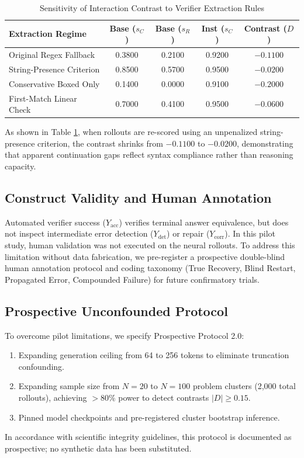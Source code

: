 \documentclass[conference]{IEEEtran}
\begin{document}
\begin{table}[htbp]
\caption{Sensitivity of Interaction Contrast to Verifier Extraction Rules}
\label{tab:verifier_sensitivity}
\centering
\begin{tabularx}{\columnwidth}{Xcccc}
\toprule
\textbf{Extraction Regime} & \textbf{Base ($s_C$)} & \textbf{Base ($s_R$)} & \textbf{Inst ($s_C$)} & \textbf{Contrast ($D$)} \\
\midrule
Original Regex Fallback & 0.3800 & 0.2100 & 0.9200 & \textbf{$-0.1100$} \\
String-Presence Criterion & 0.8500 & 0.5700 & 0.9500 & \textbf{$-0.0200$} \\
Conservative Boxed Only & 0.1400 & 0.0000 & 0.9100 & \textbf{$-0.2000$} \\
First-Match Linear Check & 0.7000 & 0.4100 & 0.9500 & \textbf{$-0.0600$} \\
\bottomrule
\end{tabularx}
\end{table}

As shown in Table \ref{tab:verifier_sensitivity}, when rollouts are re-scored using an unpenalized string-presence criterion, the contrast shrinks from $-0.1100$ to $-0.0200$, demonstrating that apparent continuation gaps reflect syntax compliance rather than reasoning capacity.

\subsection{Construct Validity and Human Annotation}
Automated verifier success ($Y_{\text{acc}}$) verifies terminal answer equivalence, but does not inspect intermediate error detection ($Y_{\text{det}}$) or repair ($Y_{\text{corr}}$). In this pilot study, human validation was not executed on the neural rollouts. To address this limitation without data fabrication, we pre-register a prospective double-blind human annotation protocol and coding taxonomy (True Recovery, Blind Restart, Propagated Error, Compounded Failure) for future confirmatory trials.

\subsection{Prospective Unconfounded Protocol}
To overcome pilot limitations, we specify Prospective Protocol 2.0:
\begin{enumerate}
    \item Expanding generation ceiling from 64 to 256 tokens to eliminate truncation confounding.
    \item Expanding sample size from $N=20$ to $N=100$ problem clusters (2,000 total rollouts), achieving $>80\%$ power to detect contrasts $|D| \ge 0.15$.
    \item Pinned model checkpoints and pre-registered cluster bootstrap inference.
\end{enumerate}
In accordance with scientific integrity guidelines, this protocol is documented as prospective; no synthetic data has been substituted.
\end{document}
